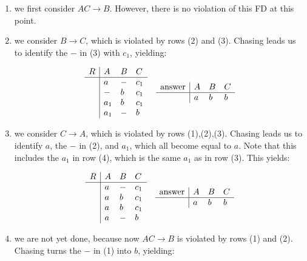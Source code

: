 \begin{enumerate}
\item we first consider $AC \rightarrow B$. However, there is no violation of this FD at this point.
\item we consider $B \rightarrow C$, which is violated by rows (2) and (3). Chasing leads us to identify the $-$ in (3) with $c_1$, yielding:

$$
\begin{array}{ll}
\begin{array}{l|lll}
R & A & B & C \\ \hline
& a & - & c_1 \\
& - & b & c_1 \\
& a_1 & b & c_1 \\
& a_1 & - & b \\
\end{array} &
\begin{array}{l|lll}
\mbox{answer} & A & B & C \\ \hline
&  a & b & b \\
\end{array}
\end{array}
$$

\item we consider $C \rightarrow A$, which is violated by rows (1),(2),(3). Chasing leads us to identify $a$, the $-$ in (2), and $a_1$,
which all become equal to $a$. Note that this includes the $a_1$ in row (4), which is the same $a_1$ as in row (3).  This yields:

\vspace{5mm}
$$
\begin{array}{ll}
\begin{array}{l|lll}
R & A & B & C \\ \hline
& a & - & c_1 \\
& a & b & c_1 \\
& a & b & c_1 \\
& a & - & b \\
\end{array} &
\begin{array}{l|lll}
\mbox{answer} & A & B & C \\ \hline
&  a & b & b \\
\end{array}
\end{array}
$$

\item we are not yet done, because now $AC \rightarrow B$ is violated by rows (1) and (2). Chasing turns the $-$ in (1) into $b$, yielding:


\end{enumerate}
